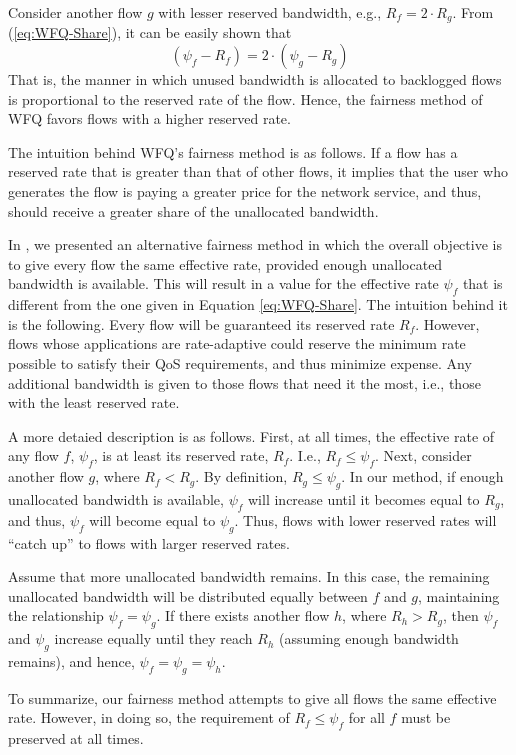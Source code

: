 \documentclass[conference]{IEEEtran}
\begin{document}
Consider another flow $g$ with lesser reserved bandwidth, e.g., $R_f = 2\cdot 
R_g$.  From (\ref{eq:WFQ-Share}), it can be easily shown that
\[
(\psi_f - R_f) = 2\cdot (\psi_g - R_g)
\]
\noindent
That is, the manner in which unused bandwidth is allocated to backlogged flows 
is proportional to the reserved rate of the flow. Hence, the fairness method of 
WFQ favors flows with a higher reserved rate. 

The intuition behind WFQ's fairness method is as follows. If a flow has a 
reserved rate that is greater than that of other flows, it implies that the 
user who generates the flow is paying a greater price for the network service, 
and thus, should receive a greater share of the unallocated bandwidth.

In \cite{Cobb-REQ}, we presented an alternative fairness method in which the 
overall objective is to give every flow the same effective rate, provided 
enough unallocated bandwidth is available. This will result in a value for the 
effective rate $\psi_f$ that is different from the one given in Equation 
\eqref{eq:WFQ-Share}. The intuition behind it is the following. Every flow will 
be guaranteed its reserved rate $R_f$. However, flows whose applications are 
rate-adaptive could reserve the minimum rate possible to satisfy their QoS 
requirements, and thus minimize expense. Any additional bandwidth is given to 
those flows that need it the most, i.e., those with the least reserved rate. 

A more detaied description is as follows. First, at all times, the effective 
rate of any flow $f$, $\psi_f$, is at least its reserved rate, $R_f$. I.e., 
$R_f \leq \psi_f$. Next, consider another flow $g$, where $R_f < R_g$. By 
definition, $R_g \leq \psi_g$.  In our method, if enough unallocated bandwidth 
is available, $\psi_f$ will increase until it becomes equal to $R_g$, and thus, 
$\psi_f$ will become equal to $\psi_g$. Thus, flows with lower reserved rates 
will ``catch up'' to flows with larger reserved rates.

Assume that more unallocated bandwidth remains. In this case, the remaining 
unallocated bandwidth will be distributed equally between $f$ and $g$, 
maintaining the relationship $\psi_f = \psi_g$. If there exists another flow 
$h$, where $R_h > R_g$, then $\psi_f$ and $\psi_g$ increase equally until they 
reach $R_h$ (assuming enough bandwidth remains), and hence, $\psi_f = \psi_g = 
\psi_h$.

To summarize, our fairness method attempts to give all flows the same effective 
rate. However, in doing so, the requirement of $R_f \leq \psi_f$ for all $f$ 
must be preserved at all times.
\end{document}
